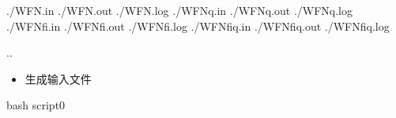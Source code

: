\documentclass[a4paper,12pt,english]{sphinxmanual}
\begin{document}
\begin{sphinxVerbatim}[commandchars=\\\{\}]

 

 ./WFN.in ./WFN.out ./WFN.log
 ./WFNq.in ./WFNq.out ./WFNq.log
 ./WFN\PYGZus{}fi.in ./WFN\PYGZus{}fi.out ./WFN\PYGZus{}fi.log
 ./WFN\PYGZus{}fiq.in ./WFN\PYGZus{}fiq.out ./WFN\PYGZus{}fiq.log

 ..
\end{sphinxVerbatim}
\begin{itemize}
\item {} 
\sphinxAtStartPar
生成输入文件

\end{itemize}

\begin{sphinxVerbatim}[commandchars=\\\{\}]
bash script\PYGZus{}0
\end{sphinxVerbatim}
\end{document}
